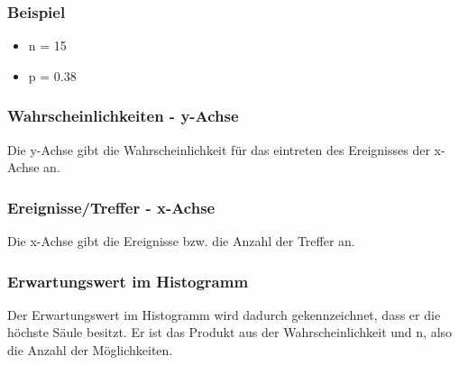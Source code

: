 	\subsubsection{Beispiel}
	\begin{itemize}
		\item n = 15
		\item p = 0.38
	\end{itemize}
	\subsubsection{Wahrscheinlichkeiten - y-Achse}
	Die y-Achse gibt die Wahrscheinlichkeit für das eintreten des Ereignisses der x-Achse an.
	
	\subsubsection{Ereignisse/Treffer - x-Achse}
	Die x-Achse gibt die Ereignisse bzw. die Anzahl der Treffer an.
	
	\subsubsection{Erwartungswert im Histogramm}
	Der Erwartungswert im Histogramm wird dadurch gekennzeichnet, dass er die höchste Säule besitzt. Er ist das Produkt aus der Wahrscheinlichkeit und n, also die Anzahl der Möglichkeiten.


